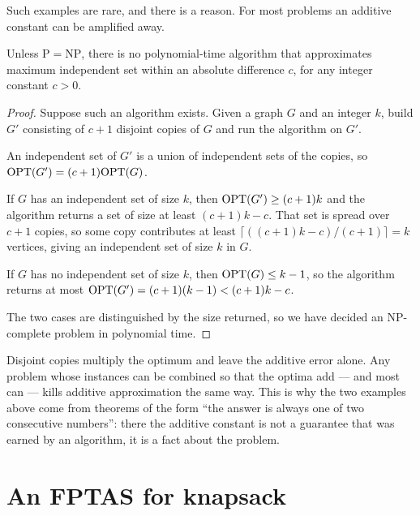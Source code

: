 Such examples are rare, and there is a reason. For most problems an additive
constant can be amplified away.

\begin{theorem}\label{thm:no-additive-is}
Unless $\mathrm{P} = \mathrm{NP}$, there is no polynomial-time algorithm that
approximates maximum independent set within an absolute difference $c$, for any
integer constant $c > 0$.
\end{theorem}

\begin{proof}
Suppose such an algorithm exists. Given a graph $G$ and an integer $k$, build
$G'$ consisting of $c+1$ disjoint copies of $G$ and run the algorithm on $G'$.

An independent set of $G'$ is a union of independent sets of the copies, so
$\mathrm{OPT}(G') = (c+1)\mathrm{OPT}(G)$.

If $G$ has an independent set of size $k$, then $\mathrm{OPT}(G') \ge (c+1)k$ and the
algorithm returns a set of size at least $(c+1)k - c$. That set is spread over
$c+1$ copies, so some copy contributes at least
$\lceil ((c+1)k-c)/(c+1) \rceil = k$ vertices, giving an independent set of size
$k$ in $G$.

If $G$ has no independent set of size $k$, then $\mathrm{OPT}(G) \le k-1$, so the
algorithm returns at most $\mathrm{OPT}(G') = (c+1)(k-1) < (c+1)k - c$.

The two cases are distinguished by the size returned, so we have decided an
\textrm{NP}-complete problem in polynomial time.
\end{proof}

\begin{intuition}
Disjoint copies multiply the optimum and leave the additive error alone. Any
problem whose instances can be combined so that the optima add --- and most can
--- kills additive approximation the same way. This is why the two examples
above come from theorems of the form ``the answer is always one of two
consecutive numbers'': there the additive constant is not a guarantee that was
earned by an algorithm, it is a fact about the problem.
\end{intuition}

\section{An FPTAS for knapsack}
\label{sec:knapsack-fptas}

